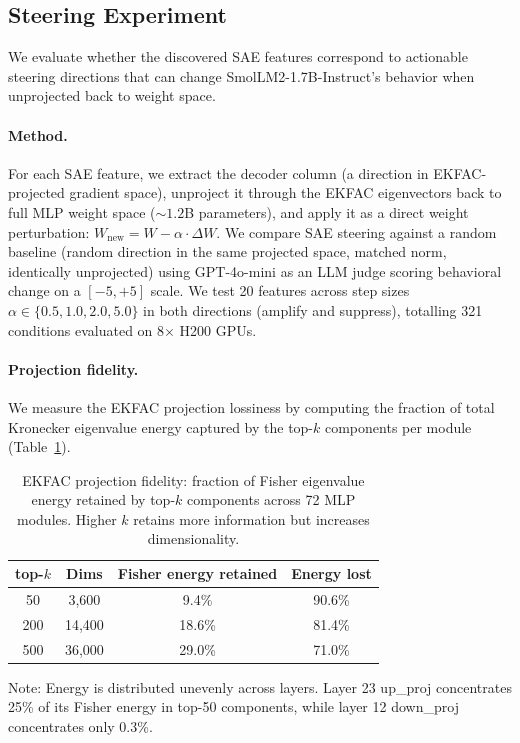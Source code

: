 \subsection{Steering Experiment}

We evaluate whether the discovered SAE features correspond to actionable steering directions that can change SmolLM2-1.7B-Instruct's behavior when unprojected back to weight space.

\paragraph{Method.} For each SAE feature, we extract the decoder column (a direction in EKFAC-projected gradient space), unproject it through the EKFAC eigenvectors back to full MLP weight space (${\sim}1.2$B parameters), and apply it as a direct weight perturbation: $W_{\text{new}} = W - \alpha \cdot \Delta W$. We compare SAE steering against a random baseline (random direction in the same projected space, matched norm, identically unprojected) using GPT-4o-mini as an LLM judge scoring behavioral change on a $[-5, +5]$ scale. We test 20 features across step sizes $\alpha \in \{0.5, 1.0, 2.0, 5.0\}$ in both directions (amplify and suppress), totalling 321 conditions evaluated on 8$\times$ H200 GPUs.

\paragraph{Projection fidelity.} We measure the EKFAC projection lossiness by computing the fraction of total Kronecker eigenvalue energy captured by the top-$k$ components per module (Table~\ref{tab:projection-loss}).

\begin{table}[t]
\centering
\caption{EKFAC projection fidelity: fraction of Fisher eigenvalue energy retained by top-$k$ components across 72 MLP modules. Higher $k$ retains more information but increases dimensionality.}
\label{tab:projection-loss}
\small
\begin{tabular}{cccc}
\toprule
\textbf{top-$k$} & \textbf{Dims} & \textbf{Fisher energy retained} & \textbf{Energy lost} \\
\midrule
50  & 3{,}600  & 9.4\%  & 90.6\% \\
200 & 14{,}400 & 18.6\% & 81.4\% \\
500 & 36{,}000 & 29.0\% & 71.0\% \\
\bottomrule
\end{tabular}
\vspace{0.3em}

\footnotesize
Note: Energy is distributed unevenly across layers. Layer 23 up\_proj concentrates 25\% of its Fisher energy in top-50 components, while layer 12 down\_proj concentrates only 0.3\%.
\end{table}

